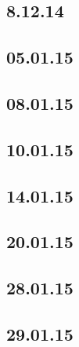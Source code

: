 \documentclass[11pt]{article}
\begin{document}
	\subsection{8.12.14}
	

	\subsection{05.01.15}
	

	\subsection{08.01.15}
	

	\subsection{10.01.15}
	
	
	\subsection{14.01.15}
	

	\subsection{20.01.15}
	
	
	\subsection{28.01.15}
	

	\subsection{29.01.15}
	
\end{document}
